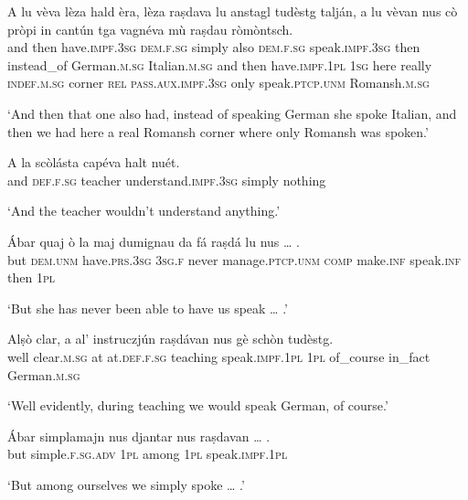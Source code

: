 \begin{linenumbers}
\gll A lu vèva lèza hald èra, lèza raṣdava lu anstagl tudèstg talján, a lu vèvan nus cò pròpi in cantún tga vagnéva mù raṣdau ròmòntsch.\\
and then have.\textsc{impf.3sg} \textsc{dem.f.sg} simply also \textsc{dem.f.sg} speak.\textsc{impf.3sg} then instead\_of German.\textsc{m.sg} Italian.\textsc{m.sg} and then have.\textsc{impf.1pl} \textsc{1sg} here really \textsc{indef.m.sg} corner \textsc{rel} \textsc{pass.aux.impf.3sg} only speak.\textsc{ptcp.unm} Romansh.\textsc{m.sg} \\
\end{linenumbers}
\medskip
\glt `And then that one also had, instead of speaking German she spoke Italian, and then we had here a real Romansh corner where only Romansh was spoken.'
\medskip

\begin{linenumbers}
\gll    A la scòlásta capéva halt nuét.\\
and \textsc{def.f.sg} teacher understand.\textsc{impf.3sg} simply nothing\\
\end{linenumbers}
\medskip
\glt `And the teacher wouldn’t understand anything.'
\medskip

\begin{linenumbers}
\gll    Ábar quaj ò la maj dumignau da fá raṣdá lu nus … .\\
but \textsc{dem.unm} have.\textsc{prs.3sg} \textsc{3sg.f} never manage.\textsc{ptcp.unm} \textsc{comp} make.\textsc{inf} speak.\textsc{inf} then \textsc{1pl}\\
\end{linenumbers}
\medskip
\glt `But she has never been able to have us speak … .'
\medskip

\begin{linenumbers}
\gll    Alṣò clar, a al’ instruczjún raṣdávan nus gè schòn tudèstg.\\
well clear.\textsc{m.sg} at at.\textsc{def.f.sg} teaching speak.\textsc{impf.1pl} \textsc{1pl} of\_course in\_fact German.\textsc{m.sg}\\
\end{linenumbers}
\medskip
\glt `Well evidently, during teaching we would  speak German, of course.'
\medskip

\begin{linenumbers}
\gll    Ábar simplamajn nus djantar nus raṣdavan … .\\
but simple.\textsc{f.sg.adv} \textsc{1pl} among \textsc{1pl} speak.\textsc{impf.1pl}\\
\end{linenumbers}
\medskip
\glt `But among ourselves we simply spoke … .'
\medskip

